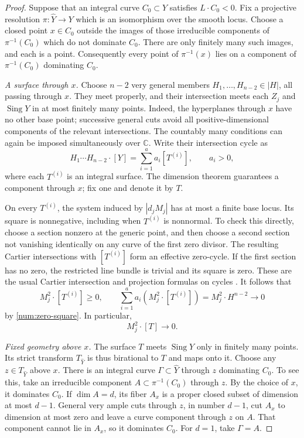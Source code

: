 \begin{proof}
Suppose that an integral curve \(C_0\subset Y\) satisfies
\(L\cdot C_0<0\).  Fix a projective resolution
\(\pi:\widehat Y\to Y\) which is an isomorphism over the smooth
locus.  Choose a closed point \(x\in C_0\) outside the images
of those irreducible components of \(\pi^{-1}(C_0)\) which do
not dominate \(C_0\).  There are only finitely many such images,
and each is a point.  Consequently every point of \(\pi^{-1}(x)\)
lies on a component of \(\pi^{-1}(C_0)\) dominating \(C_0\).

\smallskip\noindent
\emph{A surface through \(x\).}
Choose \(n-2\) very general members
\(H_1,\ldots,H_{n-2}\in|H|\), all passing through \(x\).
They meet properly, and their intersection meets each \(Z_j\)
and \(\operatorname{Sing}Y\) in at most finitely many points.
Indeed, the hyperplanes through \(x\) have no other base point;
successive general cuts avoid all positive-dimensional components
of the relevant intersections.  The countably many conditions
can again be imposed simultaneously over \(\mathbb C\).
Write their intersection cycle as
\[
H_1\cdots H_{n-2}\cdot[Y]=\sum_{i=1}^a a_i[T^{(i)}],
\qquad a_i>0,
\]
where each \(T^{(i)}\) is an integral surface.
The dimension theorem guarantees a component through \(x\);
fix one and denote it by \(T\).

On every \(T^{(i)}\), the system induced by \(|d_jM_j|\) has at
most a finite base locus.  Its square is nonnegative, including
when \(T^{(i)}\) is nonnormal.  To check this directly, choose a
section nonzero at the generic point, and then choose a second
section not vanishing identically on any curve of the first
zero divisor.  The resulting Cartier intersections with
\([T^{(i)}]\) form an effective zero-cycle.  If the first section
has no zero, the restricted line bundle is trivial and its
square is zero.  These are the usual Cartier intersection and
projection formulas on cycles \cite[Chapter~2]{Fulton98}.
It follows that
\[
M_j^2\cdot[T^{(i)}]\geq0,
\qquad
\sum_{i=1}^a a_i(M_j^2\cdot[T^{(i)}])
=M_j^2\cdot H^{n-2}\longrightarrow 0
\]
by \eqref{num:zero-square}.  In particular,
\begin{equation}\label{num:special-surface-limit}
M_j^2\cdot[T]\longrightarrow 0.
\end{equation}

\smallskip\noindent
\emph{Fixed geometry above \(x\).}
The surface \(T\) meets \(\operatorname{Sing}Y\) only in finitely
many points.  Its strict transform \(T_{\widehat Y}\) is thus
birational to \(T\) and maps onto it.  Choose any
\(z\in T_{\widehat Y}\) above \(x\).
There is an integral curve \(\Gamma\subset\widehat Y\)
through \(z\) dominating \(C_0\).  To see this, take an
irreducible component \(A\subset\pi^{-1}(C_0)\) through \(z\).
By the choice of \(x\), it dominates \(C_0\).  If
\(\dim A=d\), its fiber \(A_x\) is a proper closed subset
of dimension at most \(d-1\).  General very ample cuts through
\(z\), in number \(d-1\), cut \(A_x\) to dimension at most
zero and leave a curve component through \(z\) on \(A\).
That component cannot lie in \(A_x\), so it dominates \(C_0\).
For \(d=1\), take \(\Gamma=A\).


\end{proof}
